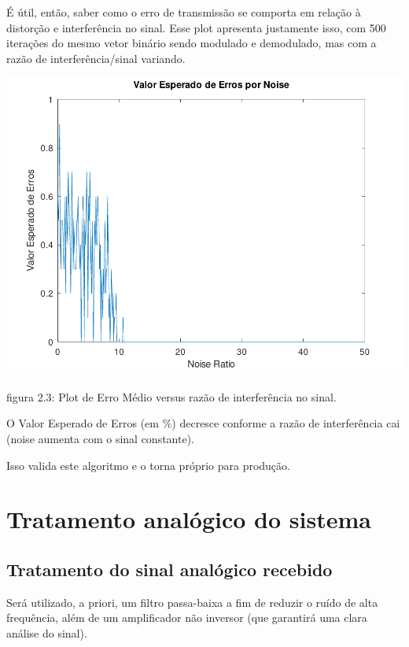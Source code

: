 \documentclass[11pt,a4paper]{report}
\begin{document}
	É útil, então, saber como o erro de transmissão se comporta em relação à distorção e interferência no sinal. Esse plot apresenta justamente isso, com 500 iterações do mesmo vetor binário sendo modulado e demodulado, mas com a razão de interferência/sinal variando. 
	\begin{center}

		\includegraphics[clip, trim=0.0cm 0cm 0.0cm 0.0cm, 								width=1.00\textwidth]{errorplot}
	\end{center}
\begin{center}
	{\footnotesize figura 2.3: Plot de Erro Médio versus razão de interferência no sinal.}
\end{center}

	O Valor Esperado de Erros (em $\%$) decresce conforme a razão de interferência cai (noise aumenta com o sinal constante). \newline
	
	Isso valida este algoritmo e o torna próprio para produção.
	\newpage
	
\chapter{Tratamento analógico do sistema}
	\section{Tratamento do sinal analógico recebido}

Será utilizado, a priori, um filtro passa-baixa a fim de reduzir o ruído de alta frequência, além de um amplificador não inversor (que garantirá uma clara análise do sinal).
\end{document}

